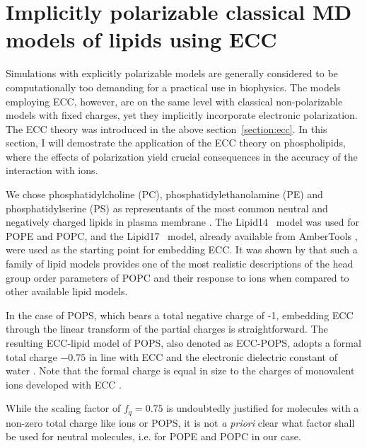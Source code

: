  

 
 



\section{Implicitly polarizable classical MD models of lipids using ECC}
\label{section:ecc-lipids}

Simulations with explicitly polarizable models are generally considered to be computationally too demanding for a practical use in biophysics. 
The models employing ECC, however, are on the same level with classical non-polarizable models with fixed charges, yet they implicitly incorporate electronic polarization. 
The ECC theory was introduced in the above section~\ref{section:ecc}.
In this section, I will demostrate the application of the ECC theory on phospholipids, 
where the effects of polarization yield crucial consequences in the accuracy of the interaction with ions. 

We chose phosphatidylcholine (PC), phosphatidylethanolamine (PE) and phosphatidylserine (PS)
as representants of the most common neutral and negatively charged lipids in plasma membrane \citep{the_review_with_pie_charts_on_my_desk, marsh13}. 
The Lipid14~\citep{dickson14} model was used for POPE and POPC,
and the Lipid17~\citep{lipid17} model, already available from AmberTools \citep{ferrer13},
were used as the starting point for embedding ECC.
It was shown by \citet{botan15, catte16} that such a family of lipid models provides one of the most 
realistic descriptions of the head group order parameters of POPC and their response to ions 
when compared to other available lipid models. 

In the case of POPS, which bears a total negative charge of -1, 
embedding ECC through the linear transform of the partial charges is straightforward. 
The resulting ECC-lipid model of POPS, also denoted as ECC-POPS, 
adopts a formal total charge $-0.75$ in line with ECC and the electronic dielectric constant of water \citep{leontyev14}. 
Note that the formal charge is equal in size to the charges of monovalent ions developed with ECC \citep{Pluharova2014, kohagen14, kohagen16, martinek17}.

While the scaling factor of $f_q = 0.75$ is undoubtedly justified for molecules with a non-zero total charge like ions or POPS,
it is not \emph{a priori} clear what factor shall be used for neutral molecules, i.e. for POPE and POPC in our case.

